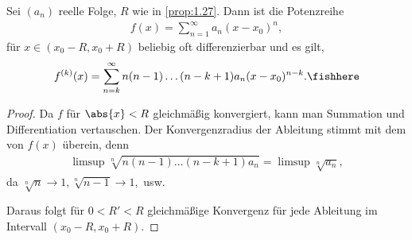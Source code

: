 \begin{prop}
\label{prop:1.28}
Sei $(a_n)$ reelle Folge, $R$ wie in \ref{prop:1.27}. Dann ist die Potenzreihe
\begin{align*}
f(x) = \sum\limits_{n=1}^\infty a_n(x-x_0)^n,
\end{align*}
für $x\in(x_0-R,x_0+R)$ beliebig oft differenzierbar und es gilt,
\begin{align*}
f^{(k)}(x) = \sum\limits_{n=k}^\infty n(n-1)\ldots(n-k+1)
a_n(x-x_0)^{n-k}.\fishhere
\end{align*}
\end{prop}
\begin{proof}
Da $f$ für $\abs{x} < R$ gleichmäßig konvergiert, kann man Summation und
Differentiation vertauschen. Der Konvergenzradius der Ableitung stimmt mit dem
von $f(x)$ überein, denn
\begin{align*}
\limsup \sqrt[n]{n(n-1)\ldots(n-k+1) a_n} = \limsup
\sqrt[n]{a_n},
\end{align*}
da $\sqrt[n]{n}\to 1, \sqrt[n]{n-1} \to 1,$ usw.

Daraus folgt für $0<R'<R$ gleichmäßige Konvergenz für jede Ableitung im
Intervall $(x_0-R,x_0+R)$.\qedhere
\end{proof}